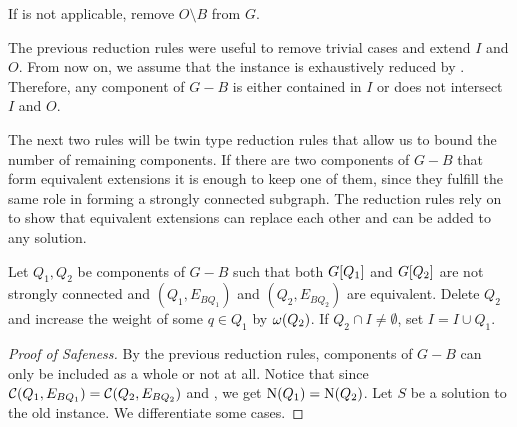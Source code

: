 \begin{theorem}
\begin{lemma}
\begin{theorem}
\begin{lemma}
\begin{reduction*}
\begin{reduction*}
\begin{reduction*}\label{red:remove_out}
  If  is not applicable, remove $O \setminus B$ from $G$.
\end{reduction*}
The previous reduction rules were useful to remove trivial cases and extend $I$ and $O$.
From now on, we assume that the instance is exhaustively reduced by .
Therefore, any component of $G - B$ is either contained in $I$ or does not intersect $I$ and $O$.

The next two rules will be twin type reduction rules that allow us to bound the number of remaining components.
If there are two components of $G-B$ that form equivalent extensions it is enough to keep one of them, since they fulfill the same role in forming a strongly connected subgraph. The reduction rules rely on  to show that equivalent extensions can replace each other and can be added to any solution.

\iflong
\begin{reduction*}
\else
\begin{reduction*}[$\star$]
\fi
\label{red:scc_twins}
  Let $Q_1, Q_2$ be components of $G - B$ such that both ${G}[{Q_1}]$ and ${G}[{Q_2}]$ are not strongly connected and $(Q_1, E_{BQ_1})$ and $(Q_2, E_{BQ_2})$ are equivalent. Delete $Q_2$ and increase the weight of some $q \in Q_1$ by $\operatorname{\omega}({Q_2})$. If $Q_2 \cap I \ne \emptyset$, set $I = I \cup Q_1$.
\end{reduction*}
\iflong
\begin{proof}[Proof of Safeness]
  By the previous reduction rules, components of $G-B$ can only be included as a whole or not at all. Notice that since $\operatorname{\mathcal{C}}({Q_1, E_{BQ_1}}) = \operatorname{\mathcal{C}}({Q_2, E_{BQ_2}})$ and , we get $\operatorname{N}({Q_1}) = \operatorname{N}({Q_2})$. Let $S$ be a solution to the old instance. We differentiate some cases.


\end{proof}
\end{reduction*}
\end{reduction*}
\end{reduction*}
\end{lemma}
\end{theorem}
\end{lemma}
\end{theorem}
